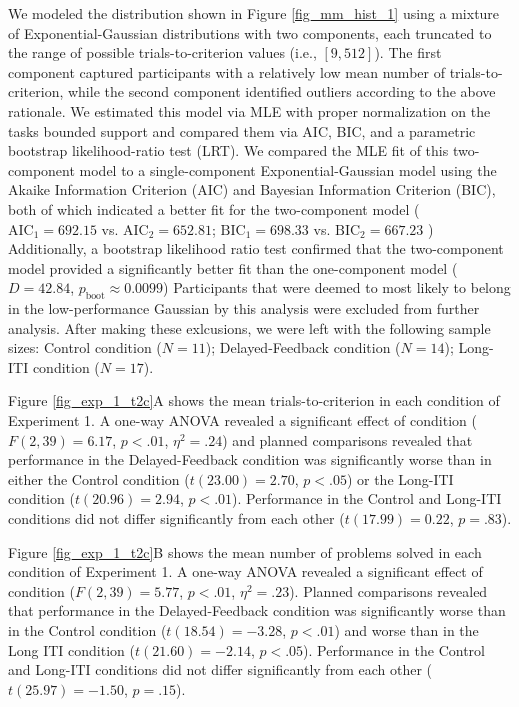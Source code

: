 \documentclass[doc, floatsintext]{apa7}
\begin{document}
We modeled the distribution shown in Figure
\ref{fig_mm_hist_1} using a mixture of Exponential-Gaussian
distributions with two components, each truncated to the
range of possible trials-to-criterion values (i.e., $[9,
512]$). The first component captured participants with a
relatively low mean number of trials-to-criterion, while the
second component identified outliers according to the above
rationale.  We estimated this model via MLE with proper
normalization on the tasks bounded support and compared them
via AIC, BIC, and a parametric bootstrap likelihood-ratio
test (LRT).  We compared the MLE fit of this two-component
model to a single-component Exponential-Gaussian model using
the Akaike Information Criterion (AIC) and Bayesian
Information Criterion (BIC), both of which indicated a
better fit for the two-component model 
(
$\mathrm{AIC}_1=692.15$ vs. $\mathrm{AIC}_2=652.81$; 
$\mathrm{BIC}_1=698.33$ vs. $\mathrm{BIC}_2=667.23$
)
Additionally, a bootstrap likelihood ratio test confirmed
that the two-component model provided a significantly better
fit than the one-component model ($D=42.84$,
$p_{\text{boot}}\approx 0.0099$) Participants that were
deemed to most likely to belong in the low-performance
Gaussian by this analysis were excluded from further
analysis. After making these exlcusions, we were left with
the following sample sizes:  Control condition ($ N = 11$);
Delayed-Feedback condition ($N = 14$); Long-ITI condition
($N = 17$).

Figure \ref{fig_exp_1_t2c}A shows the mean
trials-to-criterion in each condition of Experiment 1.  A
one-way ANOVA revealed a significant effect of condition
($F(2, 39) = 6.17$, $p < .01$, $\eta^2 = .24$) and planned
comparisons revealed that performance in the
Delayed-Feedback condition was significantly worse than in
either the Control condition ($t(23.00) = 2.70$, $p < .05$)
or the Long-ITI condition ($t(20.96) = 2.94$, $p < .01$).
Performance in the Control and Long-ITI conditions did not
differ significantly from each other ($t(17.99) = 0.22$, $p
= .83$).

Figure \ref{fig_exp_1_t2c}B shows the mean number of
problems solved in each condition of Experiment 1. A one-way
ANOVA revealed a significant effect of condition ($F(2, 39)
= 5.77$, $p < .01$, $\eta^2 = .23$). Planned comparisons
revealed that performance in the Delayed-Feedback condition
was significantly worse than in the Control condition
($t(18.54) = -3.28$, $p < .01$) and worse than in the Long
ITI condition ($t(21.60) = -2.14$, $p < .05$).  Performance
in the Control and Long-ITI conditions did not differ
significantly from each other ($t(25.97) = -1.50$, $p=.15$).
\end{document}
